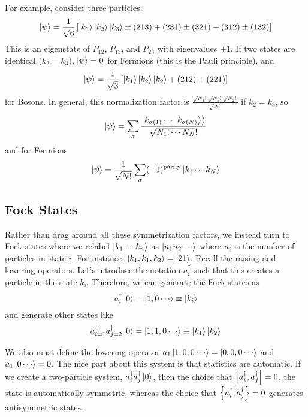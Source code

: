 \documentclass[a4paper,twoside,master.tex]{subfiles}
\begin{document}
For example, consider three particles:
\begin{equation}
    \ket{\psi} = \frac{1}{\sqrt{6}} \left[\ket{k_1}\ket{k_2}\ket{k_3} \pm (213) + (231) \pm (321) + (312) \pm (132) \right]
\end{equation}
This is an eigenstate of $ P_{12} $, $ P_{13} $, and $ P_{23} $ with eigenvalues $ \pm 1 $. If two states are identical ($ k_2 = k_3 $), $\ket{\psi} = 0 $ for Fermions (this is the Pauli principle), and
\begin{equation}
    \ket{\psi} = \frac{1}{\sqrt{3}} \left[\ket{k_1}\ket{k_2}\ket{k_2} + (212) + (221) \right]
\end{equation}
for Bosons. In general, this normalization factor is $ \frac{\sqrt{N_1!} \sqrt{N_2!} \sqrt{N_2!}}{\sqrt{N!}} $ if $ k_2 = k_3 $, so
\begin{equation}
    \ket{\psi} = \sum_{\sigma} \frac{\ket{k_{\sigma(1)} \cdots\ket{k_{\sigma(N)}}}}{\sqrt{N_1! \cdots N_N!}}
\end{equation}
and for Fermions
\begin{equation}
    \ket{\psi} = \frac{1}{\sqrt{N!}} \sum_{\sigma} (-1)^{\text{parity}}\ket{k_1 \cdots k_N}
\end{equation}

\subsection{Fock States}
\label{sub:fock_states}

Rather than drag around all these symmetrization factors, we instead turn to Fock states where we relabel $\ket{k_1 \cdots k_n} $ as $\ket{n_1 n_2 \cdots} $ where $ n_i $ is the number of particles in state $ i $. For instance, $\ket{k_1, k_1, k_2} =\ket{21}  $. Recall the raising and lowering operators. Let's introduce the notation $ a_i^\dagger $ such that this creates a particle in the state $ k_i $. Therefore, we can generate the Fock states as
\begin{equation}
    a_i^\dagger\ket{0} =\ket{1,0\cdots} \equiv\ket{k_i}
\end{equation}
and generate other states like
\begin{equation}
    a_{i=1}^\dagger a_{j=2}^\dagger\ket{0} =\ket{1,1,0\cdots} \equiv \ket{k_1}\ket{k_2}
\end{equation}

We also must define the lowering operator $ a_1\ket{1,0,0\cdots} =\ket{0,0,0\cdots} $ and $ a_1\ket{0\cdots} = 0 $. The nice part about this system is that statistics are automatic. If we create a two-particle system, $ a_i^\dagger a_j^\dagger\ket{0} $, then the choice that $ \comm{a_i^\dagger}{a_j^\dagger} = 0 $, the state is automatically symmetric, whereas the choice that $ \pb{a_i^\dagger}{a_j^\dagger} = 0 $ generates antisymmetric states.
\end{document}
